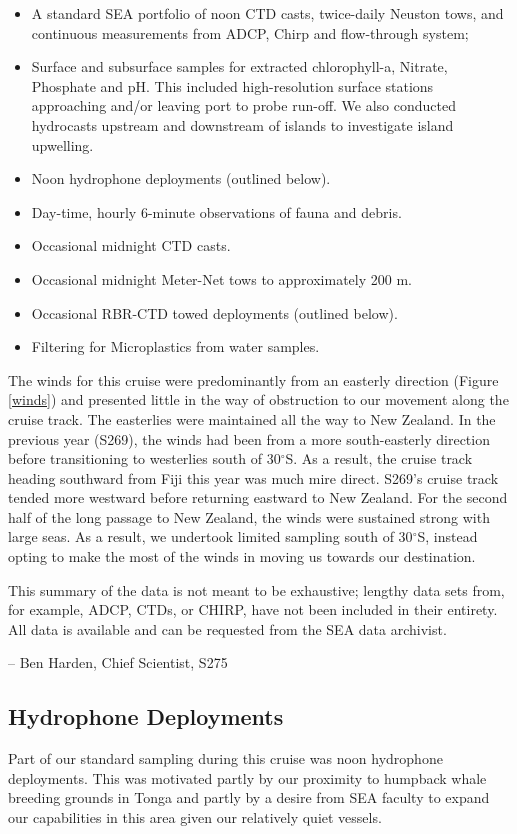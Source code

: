\documentclass[letterpaper,11pt]{article}
\newcommand{\cruiseID}{S275}
\begin{document}
\begin{itemize}
  \item A standard SEA portfolio of noon CTD casts, twice-daily Neuston tows, and continuous measurements from ADCP, Chirp and flow-through system;
 \item Surface and subsurface samples for extracted chlorophyll-a, Nitrate, Phosphate and pH. This included high-resolution surface stations approaching and/or leaving port to probe run-off. We also conducted hydrocasts upstream and downstream of islands to investigate island upwelling.
 \item Noon hydrophone deployments (outlined below).
 \item Day-time, hourly 6-minute observations of fauna and debris.
 \item Occasional midnight CTD casts.
 \item Occasional midnight Meter-Net tows to approximately 200 m.
 \item Occasional RBR-CTD towed deployments (outlined below).
 \item Filtering for Microplastics from water samples.
\end{itemize} 

The winds for this cruise were predominantly from an easterly direction (Figure \ref{winds}) and presented little in the way of obstruction to our movement along the cruise track. The easterlies were maintained all the way to New Zealand. In the previous year (S269), the winds had been from a more south-easterly direction before transitioning to westerlies south of 30$^{\circ}$S. As a result, the cruise track heading southward from Fiji this year was much mire direct. S269's cruise track tended more westward before returning eastward to New Zealand. For the second half of the long passage to New Zealand, the winds were sustained strong with large seas. As a result, we undertook limited sampling south of 30$^{\circ}$S, instead opting to make the most of the winds in moving us towards our destination.

This summary of the data is not meant to be exhaustive; lengthy data sets from, for example, ADCP, CTDs, or CHIRP, have not been included in their entirety. All data is available and can be requested from the SEA data archivist.

-- Ben Harden, Chief Scientist, \cruiseID


\subsection*{Hydrophone Deployments}
Part of our standard sampling during this cruise was noon hydrophone deployments. This was motivated partly by our proximity to humpback whale breeding grounds in Tonga and partly by a desire from SEA faculty to expand our capabilities in this area given our relatively quiet vessels.
\end{document}
